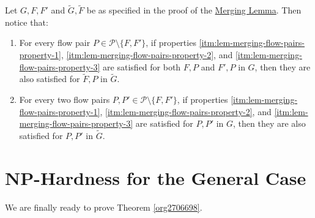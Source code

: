 \documentclass[fontsize=11pt,paper=a4]{book}
\begin{document}
\begin{remark}
Let \(G,F,F'\) and \(\tilde{G},\tilde{F}\) be as specified in the proof of the \hyperref[orgce7cb77]{Merging Lemma}.
Then notice that:

\begin{enumerate}
\item \label{itm:remark-merging-flow-pairs-1}
For every flow pair \(P\in\mathcal{P}\setminus\{F,F'\}\), if properties \ref{itm:lem-merging-flow-pairs-property-1}, \ref{itm:lem-merging-flow-pairs-property-2}, and \ref{itm:lem-merging-flow-pairs-property-3} are satisfied for both \(F,P\) and \(F',P\) in \(G\), then they are also satisfied for \(\tilde{F},P\) in \(\tilde{G}\).

\item \label{itm:remark-merging-flow-pairs-2}
For every two flow pairs \(P,P'\in\mathcal{P}\setminus\{F,F'\}\), if properties \ref{itm:lem-merging-flow-pairs-property-1}, \ref{itm:lem-merging-flow-pairs-property-2}, and \ref{itm:lem-merging-flow-pairs-property-3} are satisfied for \(P,P'\) in \(G\), then they are also satisfied for \(P,P'\) in \(\tilde{G}\).
\end{enumerate}
\label{org42d0411}
\end{remark}

\chapter{\(\textbf{NP}\)-Hardness for the General Case}
\label{sec:org362f31b}

We are finally ready to prove Theorem \ref{org2706698}.
\end{document}
